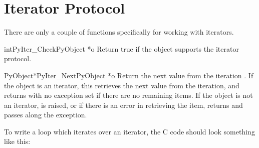 \section{Iterator Protocol \label{iterator}}


There are only a couple of functions specifically for working with
iterators.

\begin{cfuncdesc}{int}{PyIter_Check}{PyObject *o}
  Return true if the object  supports the iterator protocol.
\end{cfuncdesc}

\begin{cfuncdesc}{PyObject*}{PyIter_Next}{PyObject *o}
  Return the next value from the iteration .  If the object is
  an iterator, this retrieves the next value from the iteration, and
  returns \NULL{} with no exception set if there are no remaining
  items.  If the object is not an iterator,  is
  raised, or if there is an error in retrieving the item, returns
  \NULL{} and passes along the exception.
\end{cfuncdesc}

To write a loop which iterates over an iterator, the C code should
look something like this:


